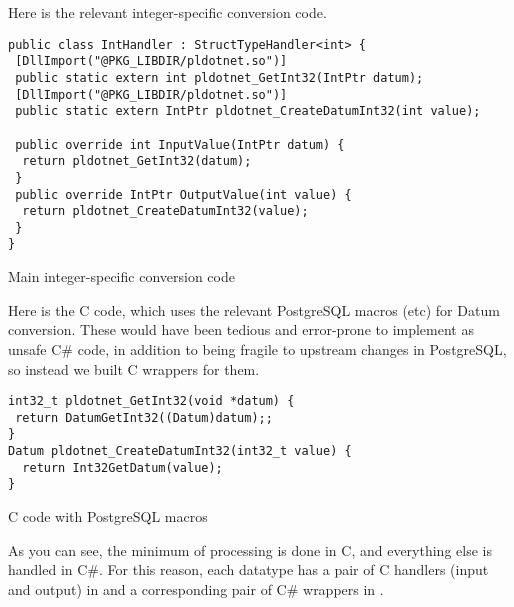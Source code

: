 \documentclass[sigconf,techreport,authorversion,nonacm]{acmart}
\begin{document}
Here is the relevant integer-specific conversion code.

\begin{listing}[H]
\begin{verbatim}
public class IntHandler : StructTypeHandler<int> {
 [DllImport("@PKG_LIBDIR/pldotnet.so")]
 public static extern int pldotnet_GetInt32(IntPtr datum);
 [DllImport("@PKG_LIBDIR/pldotnet.so")]
 public static extern IntPtr pldotnet_CreateDatumInt32(int value);

 public override int InputValue(IntPtr datum) {
  return pldotnet_GetInt32(datum);
 }
 public override IntPtr OutputValue(int value) {
  return pldotnet_CreateDatumInt32(value);
 }
}
\end{verbatim}
\caption{Main integer-specific conversion code}
\end{listing}

Here is the C code, which uses the relevant PostgreSQL macros (etc)
for Datum conversion.  These would have been tedious and error-prone
to implement as unsafe C\# code, in addition to being fragile to
upstream changes in PostgreSQL, so instead we built C wrappers for
them.

\begin{listing}[H]
\begin{verbatim}
int32_t pldotnet_GetInt32(void *datum) {
 return DatumGetInt32((Datum)datum);;
}
Datum pldotnet_CreateDatumInt32(int32_t value) {
  return Int32GetDatum(value);
}
\end{verbatim}
\caption{C code with PostgreSQL macros}
\end{listing}

As you can see, the minimum of processing is done in C, and everything
else is handled in C\#.  For this reason, each datatype has a pair
of C handlers (input and output) in
 and a corresponding
pair of C\# wrappers in .



\end{document}
